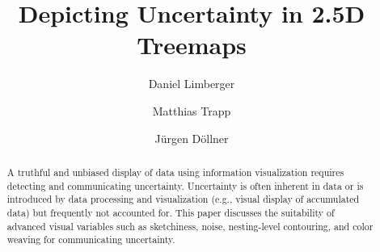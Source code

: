 \documentclass[sigconf]{acmart}
\begin{document}
\title{Depicting Uncertainty in 2.5D Treemaps}

\author{Daniel Limberger}
\author{Matthias Trapp}
\author{J{\"u}rgen D{\"o}llner}

\renewcommand{\shortauthors}{D. Limberger, M. Trapp, and J. D{\"o}llner}

\begin{abstract}
  A truthful and unbiased display of data using information visualization requires detecting and communicating uncertainty.
  Uncertainty is often inherent in data or is introduced by data processing and visualization (e.g., visual display of accumulated data) but frequently not accounted for.
  This paper discusses the suitability of advanced visual variables such as sketchiness, noise, nesting-level contouring, and color weaving for communicating uncertainty.
\end{abstract}
\end{document}
